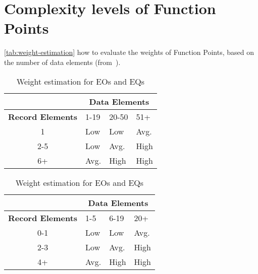 \section{Complexity levels of Function Points}
\autoref{tab:weight-estimation} how to evaluate the weights of Function Points, based on the number of data elements (from~\cite{cocomo-manual}).

\begin{table}[h]
\centering
\begin{subtable}{\textwidth}
    \centering
    \begin{tabular}{| c | l | l | l |}
        \hline
         & \multicolumn{3}{c|}{\textbf{Data Elements}} \\
        \hline
        \textbf{Record Elements} & 1-19 & 20-50 & 51+ \\
        \hline
        1       & Low     & Low     & Avg.     \\
        2-5     & Low     & Avg.    & High     \\
        6+      & Avg.    & High    & High     \\
        \hline
    \end{tabular}
    \caption{Weight estimation for ILFs and EIFs.}
\end{subtable}

\vspace{2em}

\begin{subtable}{\textwidth}
    \centering
    \begin{tabular}{| c | l | l | l |}
        \hline
         & \multicolumn{3}{c|}{\textbf{Data Elements}} \\
        \hline
        \textbf{Record Elements} & 1-5 & 6-19 & 20+ \\
        \hline
        0-1     & Low     & Low     & Avg.     \\
        2-3     & Low     & Avg.    & High     \\
        4+      & Avg.    & High    & High     \\
        \hline
    \end{tabular}
    \caption{Weight estimation for EOs and EQs}
\end{subtable}

\vspace{2em}


\end{table}
